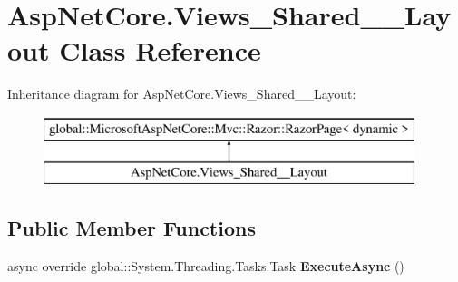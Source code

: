\hypertarget{class_asp_net_core_1_1_views___shared_____layout}{}\section{Asp\+Net\+Core.\+Views\+\_\+\+Shared\+\_\+\+\_\+\+Layout Class Reference}
\label{class_asp_net_core_1_1_views___shared_____layout}
Inheritance diagram for Asp\+Net\+Core.\+Views\+\_\+\+Shared\+\_\+\+\_\+\+Layout\+:\begin{figure}[H]
\begin{center}
\leavevmode
\includegraphics[height=2.000000cm]{class_asp_net_core_1_1_views___shared_____layout}
\end{center}
\end{figure}
\subsection*{Public Member Functions}
\begin{DoxyCompactItemize}
\item 
\mbox{\label{class_asp_net_core_1_1_views___shared_____layout_ab6d0133c47f42aa6e823d599891346cc}} 
async override global\+::\+System.\+Threading.\+Tasks.\+Task {\bfseries Execute\+Async} ()
\end{DoxyCompactItemize}
